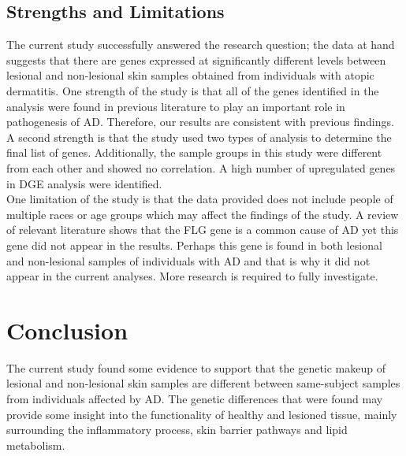 \documentclass[journal, a4paper]{IEEEtran}
\begin{document}
\subsection{\textbf{Strengths and Limitations}}

The current study successfully answered the research question; the data at hand suggests that there are genes expressed at significantly different levels between lesional and non-lesional skin samples obtained from individuals with atopic dermatitis. One strength of the study is that all of the genes identified in the analysis were found in previous literature to play an important role in pathogenesis of AD. Therefore, our results are consistent with previous findings.\\

A second strength is that the study used two types of analysis to determine the final list of genes. Additionally, the sample groups in this study were different from each other and showed no correlation. A high number of upregulated genes in DGE analysis were identified.\\

One limitation of the study is that the data provided does not include people of multiple races or age groups which may affect the findings of the study. A review of relevant literature shows that the FLG gene is a common cause of AD yet this gene did not appear in the results. Perhaps this gene is found in both lesional and non-lesional samples of individuals with AD and that is why it did not appear in the current analyses. More research is required to fully investigate.\\



\section{\textbf{Conclusion}}

The current study found some evidence to support that the genetic makeup of lesional and non-lesional skin samples are different between same-subject samples from individuals affected by AD. The genetic differences that were found may provide some insight into the functionality of healthy and lesioned tissue, mainly surrounding the inflammatory process, skin barrier pathways and lipid metabolism.\\
\end{document}
